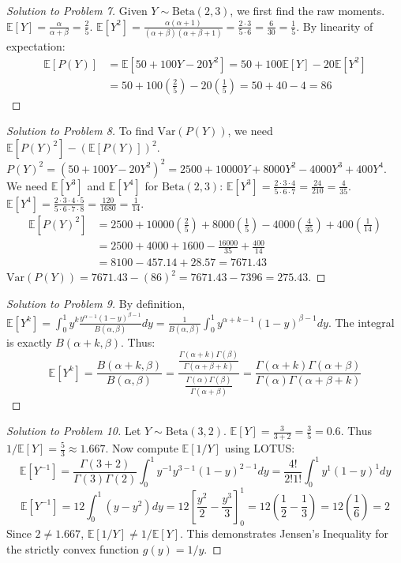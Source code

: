 \documentclass[11pt, a4paper]{article}
\theoremstyle{definition}
\theoremstyle{remark}
\newcommand{\E}{\mathbb{E}}
\begin{document}
\begin{proof}[Solution to Problem 7]
Given $Y \sim \text{Beta}(2, 3)$, we first find the raw moments.
$\E[Y] = \frac{\alpha}{\alpha+\beta} = \frac{2}{5}$.
$\E[Y^2] = \frac{\alpha(\alpha+1)}{(\alpha+\beta)(\alpha+\beta+1)} = \frac{2 \cdot 3}{5 \cdot 6} = \frac{6}{30} = \frac{1}{5}$.
By linearity of expectation:
\begin{align*}
\E[P(Y)] &= \E[50 + 100Y - 20Y^2] = 50 + 100\E[Y] - 20\E[Y^2] \\
&= 50 + 100\left(\frac{2}{5}\right) - 20\left(\frac{1}{5}\right) = 50 + 40 - 4 = 86
\end{align*}
\end{proof}

\begin{proof}[Solution to Problem 8]
To find $\text{Var}(P(Y))$, we need $\E[P(Y)^2] - (\E[P(Y)])^2$.
$P(Y)^2 = (50 + 100Y - 20Y^2)^2 = 2500 + 10000Y + 8000Y^2 - 4000Y^3 + 400Y^4$.
We need $\E[Y^3]$ and $\E[Y^4]$ for $\text{Beta}(2, 3)$:
$\E[Y^3] = \frac{2 \cdot 3 \cdot 4}{5 \cdot 6 \cdot 7} = \frac{24}{210} = \frac{4}{35}$.
$\E[Y^4] = \frac{2 \cdot 3 \cdot 4 \cdot 5}{5 \cdot 6 \cdot 7 \cdot 8} = \frac{120}{1680} = \frac{1}{14}$.
\begin{align*}
\E[P(Y)^2] &= 2500 + 10000\left(\frac{2}{5}\right) + 8000\left(\frac{1}{5}\right) - 4000\left(\frac{4}{35}\right) + 400\left(\frac{1}{14}\right) \\
&= 2500 + 4000 + 1600 - \frac{16000}{35} + \frac{400}{14} \\
&= 8100 - 457.14 + 28.57 = 7671.43
\end{align*}
$\text{Var}(P(Y)) = 7671.43 - (86)^2 = 7671.43 - 7396 = 275.43$.
\end{proof}

\begin{proof}[Solution to Problem 9]
By definition, $\E[Y^k] = \int_0^1 y^k \frac{y^{\alpha-1}(1-y)^{\beta-1}}{B(\alpha, \beta)} dy = \frac{1}{B(\alpha, \beta)} \int_0^1 y^{\alpha+k-1}(1-y)^{\beta-1} dy$.
The integral is exactly $B(\alpha+k, \beta)$. Thus:
\[
\E[Y^k] = \frac{B(\alpha+k, \beta)}{B(\alpha, \beta)} = \frac{\frac{\Gamma(\alpha+k)\Gamma(\beta)}{\Gamma(\alpha+\beta+k)}}{\frac{\Gamma(\alpha)\Gamma(\beta)}{\Gamma(\alpha+\beta)}} = \frac{\Gamma(\alpha+k)\Gamma(\alpha+\beta)}{\Gamma(\alpha)\Gamma(\alpha+\beta+k)}
\]
\end{proof}

\begin{proof}[Solution to Problem 10]
Let $Y \sim \text{Beta}(3, 2)$. $\E[Y] = \frac{3}{3+2} = \frac{3}{5} = 0.6$. Thus $1/\E[Y] = \frac{5}{3} \approx 1.667$.
Now compute $\E[1/Y]$ using LOTUS:
\[
\E[Y^{-1}] = \frac{\Gamma(3+2)}{\Gamma(3)\Gamma(2)} \int_0^1 y^{-1} y^{3-1}(1-y)^{2-1} dy = \frac{4!}{2!1!} \int_0^1 y^1 (1-y)^1 dy
\]
\[
\E[Y^{-1}] = 12 \int_0^1 (y - y^2) dy = 12 \left[ \frac{y^2}{2} - \frac{y^3}{3} \right]_0^1 = 12 \left( \frac{1}{2} - \frac{1}{3} \right) = 12 \left( \frac{1}{6} \right) = 2
\]
Since $2 \neq 1.667$, $\E[1/Y] \neq 1/\E[Y]$. This demonstrates Jensen's Inequality for the strictly convex function $g(y) = 1/y$.
\end{proof}
\end{document}
